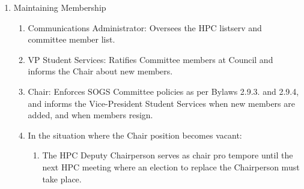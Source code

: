 \begin{enumerate} [label*=\arabic*., align=left]
\begin{enumerate} [label*=\arabic*., align=left]
\begin{enumerate}
\item Shall assign the Deputy Chair or another Committee member to take meeting minutes in
accordance with Society bylaws, "Minutes Writing Policy."
\item Shall distribute Committee minutes via the HPC listserv as per Bylaw 2.9.2.8.1.
\item Shall submit HPC updates, AGM Reports, Final Reports, Surveys, and Health Plan Bid
Shortlists, as approved by the HPC, for consideration at SOGS Council as per Bylaws
2.15.3.7 and 2.15.3.7.1.
\item Shall liaise with the Vice-President Student Services, President, and Broker for any and all
work related to the Health Plan (contracts, surveys, town halls, etc.).
\item Shall update the HPC Chair Transitional Manual at the end of their term, and submit it for
review to the Vice-President Student Services before stepping down and/or graduating.
\end{enumerate}
\item Committee members
\begin{enumerate}
\item Shall act in accordance with Bylaw 2.9.3.9.
\item Shall regularly attend committee meetings to the best of their ability.
\item Shall participate in the committee's projects to the best of their ability.
\item Shall vote to approve minutes and motions, and in elections (e.g. HPC Chair).
\end{enumerate}
\end{enumerate}
\item Maintaining Membership
\begin{enumerate} [label*=\arabic*., align=left]	
\item Communications Administrator: Oversees the HPC listserv and committee member list.
\item VP Student Services: Ratifies Committee members at Council and informs the Chair about new members.
\item Chair: Enforces SOGS Committee policies as per Bylaws 2.9.3. and 2.9.4, and informs the Vice-President Student Services when new members are added, and when members resign.
\item In the situation where the Chair position becomes vacant:
\begin{enumerate}
\item The HPC Deputy Chairperson serves as chair pro tempore until the next HPC meeting where an election to replace the Chairperson must take place.

\end{enumerate}
\end{enumerate}
\end{enumerate}
